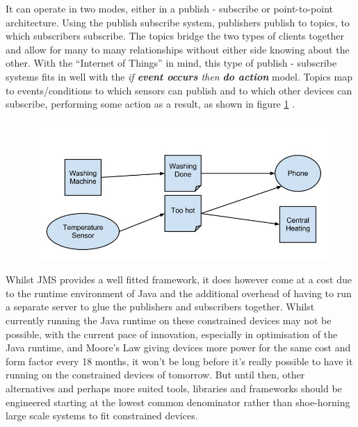 It can operate in two modes, either in a publish - subscribe or point-to-point architecture. Using the publish subscribe system, publishers publish to topics, to which subscribers subscribe. The topics bridge the two types of clients together and allow for many to many relationships without either side knowing about the other. With the ``Internet of Things'' in mind, this type of publish - subscribe systems fits in well with the \textit{if \textbf{event occurs} then \textbf{do action}} model. Topics map to events/conditions to which sensors can publish and to which other devices can subscribe, performing some action as a result, as shown in figure \ref{fig:JMS} .

\begin{figure}[h!]
	\centering
		\includegraphics[scale=0.4]{images/JMS-IoT.jpg}
		\label{fig:JMS}
\end{figure}


Whilst JMS provides a well fitted framework, it does however come at a cost due to the runtime environment of Java and the additional overhead of having to run a separate server to glue the publishers and subscribers together. Whilst currently running the Java runtime on these constrained devices may not be possible, with the current pace of innovation, especially in optimisation of the Java runtime, and Moore's Law giving devices more power for the same cost and form factor every 18 months, it won't be long before it's really possible to have it running on the constrained devices of tomorrow. But until then, other alternatives and perhaps more suited tools, libraries and frameworks should be engineered starting at the lowest common denominator rather than shoe-horning large scale systems to fit constrained devices.


